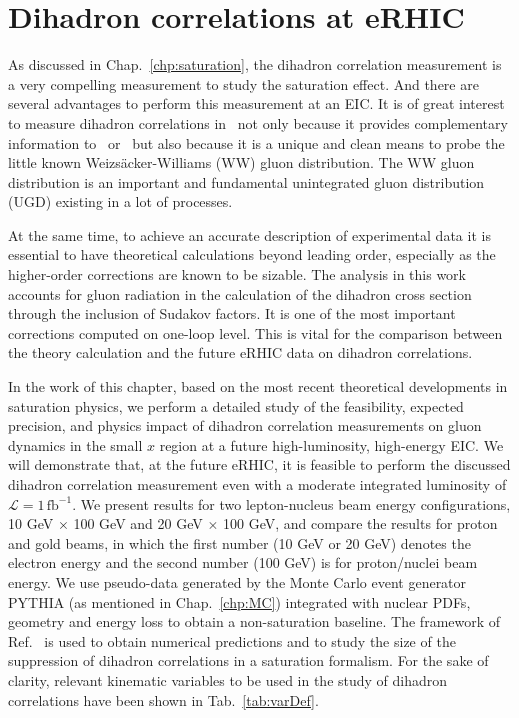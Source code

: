 \chapter{Dihadron correlations at eRHIC}
\label{chp:dihadron}
As discussed in Chap.~\ref{chp:saturation}, the dihadron correlation measurement
is a very compelling measurement to study the saturation effect. And there are
several advantages to perform this measurement at an EIC. It is of great
interest to measure dihadron correlations in \eA\ not only because it provides
complementary information to \dA\ or \pA\ but also because it is a unique and
clean means to probe the little known Weizs\"{a}cker-Williams (WW) gluon
distribution. The WW gluon distribution is an important and fundamental
unintegrated gluon distribution (UGD) existing in a lot of processes.

At the same time, to achieve an accurate description of experimental data it is
essential to have theoretical calculations beyond leading order, especially as
the higher-order corrections are known to be sizable. The analysis in this work
accounts for gluon radiation in the calculation of the dihadron cross section
through the inclusion of Sudakov factors. It is one of the most important
corrections computed on one-loop level. This is vital for the comparison between
the theory calculation and the future eRHIC data on dihadron correlations.

In the work of this chapter, based on the most recent theoretical developments in saturation
physics, we perform a detailed study of the feasibility, expected precision, and
physics impact of dihadron correlation measurements on gluon dynamics in the
small $x$ region at a future high-luminosity, high-energy EIC. We will
demonstrate that, at the future eRHIC, it is feasible to perform the discussed
dihadron correlation measurement even with a moderate integrated luminosity of
$\mathcal{L}=1 \, \mathrm{fb}^{-1}$. We present results for two lepton-nucleus beam energy
configurations, 10 GeV $\times$ 100 GeV and 20 GeV $\times$ 100 GeV, and compare
the results for proton and gold beams, in which the first number (10 GeV or 20 GeV) denotes the electron energy and the second number (100 GeV) is for proton/nuclei beam energy. We use pseudo-data generated by the Monte
Carlo event generator PYTHIA (as mentioned in Chap.~\ref{chp:MC}) integrated with nuclear PDFs,
geometry and energy loss to obtain a non-saturation baseline. The framework of
Ref.~\cite{Dominguez:2011wm} is used to obtain numerical predictions and to
study the size of the suppression of dihadron correlations in a saturation
formalism. For the sake of clarity, relevant kinematic variables
to be used in the study of dihadron correlations have been shown
in Tab.~\ref{tab:varDef}.

